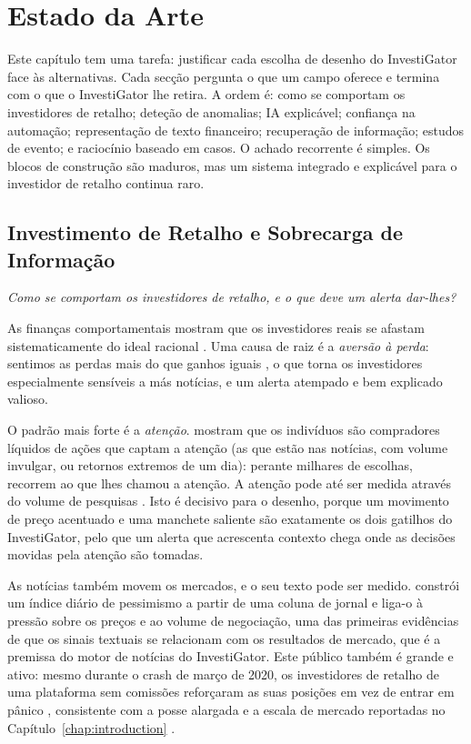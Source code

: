 
\chapter{Estado da Arte}
\label{chap:sota}

Este capítulo tem uma tarefa: justificar cada escolha de desenho do InvestiGator face às alternativas.
Cada secção pergunta o que um campo oferece e termina com o que o InvestiGator lhe retira. A ordem é:
como se comportam os investidores de retalho; deteção de anomalias; IA explicável; confiança na
automação; representação de texto financeiro; recuperação de informação; estudos de evento; e raciocínio
baseado em casos. O achado recorrente é simples. Os blocos de construção são maduros, mas um sistema
integrado e explicável para o investidor de retalho continua raro.

\section{Investimento de Retalho e Sobrecarga de Informação}
\label{sec:sota_retail}

\emph{Como se comportam os investidores de retalho, e o que deve um alerta dar-lhes?}

As finanças comportamentais mostram que os investidores reais se afastam sistematicamente do ideal
racional \autocite{barberis2003behavioral}. Uma causa de raiz é a \emph{aversão à perda}: sentimos as
perdas mais do que ganhos iguais \autocite{kahneman1979prospect}, o que torna os investidores
especialmente sensíveis a más notícias, e um alerta atempado e bem explicado valioso.

O padrão mais forte é a \emph{atenção}. \textcite{barber2008glitters} mostram que os indivíduos são
compradores líquidos de ações que captam a atenção (as que estão nas notícias, com volume invulgar, ou
retornos extremos de um dia): perante milhares de escolhas, recorrem ao que lhes chamou a atenção. A
atenção pode até ser medida através do volume de pesquisas \autocite{da2011attention}. Isto é decisivo
para o desenho, porque um movimento de preço acentuado e uma manchete saliente são exatamente os dois
gatilhos do InvestiGator, pelo que um alerta que acrescenta contexto chega onde as decisões movidas pela
atenção são tomadas.

As notícias também movem os mercados, e o seu texto pode ser medido. \textcite{tetlock2007media}
constrói um índice diário de pessimismo a partir de uma coluna de jornal e liga-o à pressão sobre os
preços e ao volume de negociação, uma das primeiras evidências de que os sinais textuais se
relacionam com os resultados de mercado, que é a premissa do motor de notícias do InvestiGator. Este público também é
grande e ativo: mesmo durante o crash de março de 2020, os investidores de retalho de uma plataforma sem
comissões reforçaram as suas posições em vez de entrar em pânico \autocite{welch2022robinhood},
consistente com a posse alargada e a escala de mercado reportadas no Capítulo~\ref{chap:introduction}
\autocite{gallup2025stock, sifma2025factbook}.

